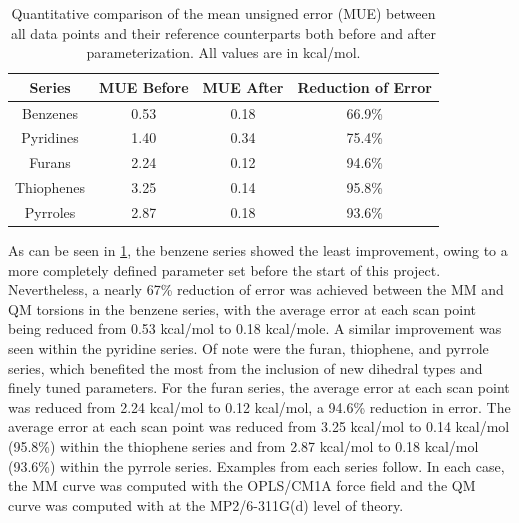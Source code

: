 \documentclass[12pt]{report}
\begin{document}
\begin{table}[ht]
\centering
\caption{Quantitative comparison of the mean unsigned error (MUE) between all data points and their reference counterparts both before and after parameterization. All values are in kcal/mol.}
\begin{tabular}{cccc}
\toprule
Series & MUE Before & MUE After & Reduction of Error \\
\midrule
Benzenes        & 0.53        & 0.18        & 66.9\%\\
Pyridines       & 1.40        & 0.34        & 75.4\%\\
Furans          & 2.24        & 0.12        & 94.6\%\\
Thiophenes      & 3.25        & 0.14        & 95.8\%\\
Pyrroles        & 2.87        & 0.18        & 93.6\%\\
\bottomrule
\end{tabular}
\label{dihred}
\end{table}

As can be seen in \cref{dihred}, the benzene series showed the least improvement, owing to a more completely defined parameter set before the start of this project. Nevertheless, a nearly 67\% reduction of error was achieved between the MM and QM torsions in the benzene series, with the average error at each scan point being reduced from 0.53 kcal/mol to 0.18 kcal/mole. A similar improvement was seen within the pyridine series. Of note were the furan, thiophene, and pyrrole series, which benefited the most from the inclusion of new dihedral types and finely tuned parameters. For the furan series, the average error at each scan point was reduced from 2.24 kcal/mol to 0.12 kcal/mol, a 94.6\% reduction in error. The average error at each scan point was reduced from 3.25 kcal/mol to 0.14 kcal/mol (95.8\%) within the thiophene series and from 2.87 kcal/mol to 0.18 kcal/mol (93.6\%) within the pyrrole series. Examples from each series follow. In each case, the MM curve was computed with the OPLS/CM1A force field and the QM curve was computed with at the MP2/6-311G(d) level of theory.
\end{document}
